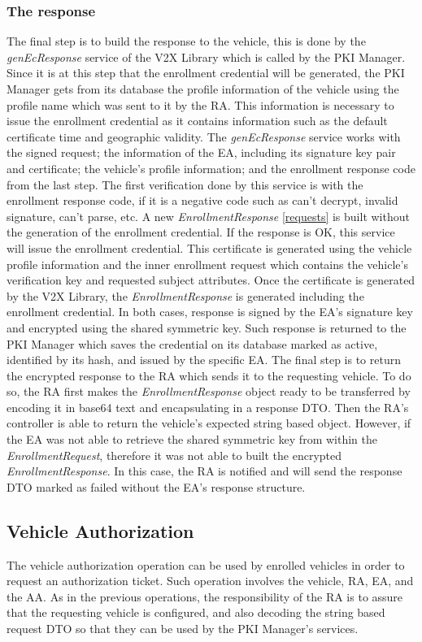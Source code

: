 \subsubsection{The response}
The final step is to build the response to the vehicle, this is done by the \textit{genEcResponse} service of the V2X Library which is called by the PKI Manager. Since it is at this step that the enrollment credential will be generated, the PKI Manager gets from its database the profile information of the vehicle using the profile name which was sent to it by the RA. This information is necessary to issue the enrollment credential as it contains information such as the default certificate time and geographic validity. The \textit{genEcResponse} service works with the signed request; the information of the EA, including its signature key pair and certificate; the vehicle's profile information; and the enrollment response code from the last step. The first verification done by this service is with the enrollment response code, if it is a negative code such as can't decrypt, invalid signature, can't parse, etc. A new \textit{EnrollmentResponse} \ref{requests} is built without the generation of the enrollment credential. If the response is OK, this service will issue the enrollment credential. This certificate is generated using the vehicle profile information and the inner enrollment request which contains the vehicle's verification key and requested subject attributes. Once the certificate is generated by the V2X Library, the \textit{EnrollmentResponse} is generated including the enrollment credential. In both cases, response is signed by the EA's signature key and encrypted using the shared symmetric key. Such response is returned to the PKI Manager which saves the credential on its database marked as active, identified by its hash, and issued by the specific EA. The final step is to return the encrypted response to the RA which sends it to the requesting vehicle. To do so, the RA first makes the \textit{EnrollmentResponse} object ready to be transferred by encoding it in base64 text and encapsulating in a response DTO. Then the RA's controller is able to return the vehicle's expected string based object. However, if the EA was not able to retrieve the shared symmetric key from within the \textit{EnrollmentRequest}, therefore it was not able to built the encrypted \textit{EnrollmentResponse}. In this case, the RA is notified and will send the response DTO marked as failed without the EA's response structure.


\subsection{Vehicle Authorization}
The vehicle authorization operation can be used by enrolled vehicles in order to request an authorization ticket. Such operation involves the vehicle, RA, EA, and the AA. As in the previous operations, the responsibility of the RA is to assure that the requesting vehicle is configured, and also decoding the string based request DTO so that they can be used by the PKI Manager's services.

